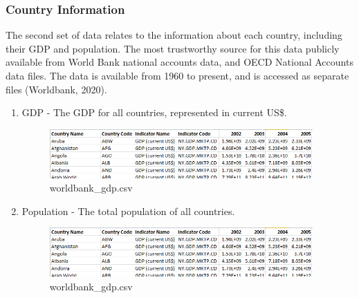 \documentclass[a4 paper, 12pt]{article}
\begin{document}
    \subsubsection{Country Information}
    The second set of data relates to the information about each country, including their GDP and population. The most trustworthy source for this data publicly available from World Bank national accounts data, and OECD National Accounts data files. The data is available from 1960 to present, and is accessed as separate files (Worldbank, 2020). 
        \begin{enumerate}
            \item GDP - The GDP for all countries, represented in current US\$.
                \begin{figure} [H]
                    \centering
                    \includegraphics[width=0.95\textwidth, frame]
                        {./images/data/worldbank_gdp.png}
                        \caption{worldbank\_gdp.csv}                    
                \end{figure}
            \item Population - The total population of all countries.
                \begin{figure} [H]
                    \centering
                    \includegraphics[width=0.95\textwidth, frame]
                        {./images/data/worldbank_gdp.png}      
                        \caption{worldbank\_gdp.csv} 
                \end{figure} 
        \end{enumerate}
\end{document}
